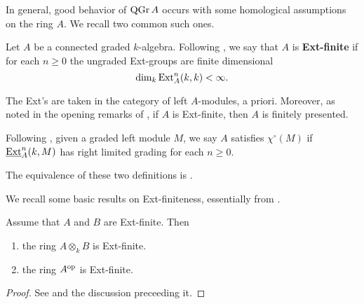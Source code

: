 In general, good behavior of \(\operatorname{QGr}A\) occurs with some homological assumptions on the ring \(A\). We recall two common such ones. 

\begin{definition} \label{definition: Ext-finite}
  Let \(A\) be a connected graded \(k\)-algebra. Following \textcite{VdB}, we say that \(A\) is \textbf{Ext-finite} if for each \(n \geq 0\) the ungraded Ext-groups are finite dimensional 
  \begin{displaymath}
    \operatorname{dim}_k \operatorname{Ext}_A^n (k,k) < \infty.
  \end{displaymath}
\end{definition}

\begin{remark}
  The Ext's are taken in the category of left \(A\)-modules, a priori.
  Moreover, as noted in the opening remarks of \textcite[Section 4.1]{BVdB}, if \(A\) is Ext-finite, then \(A\) is finitely presented.
\end{remark}

\begin{definition} \label{definition: chi}
  Following \textcite{AZ94}, given a graded left module \(M\), we say \(A\) satisfies \(\chi^\circ(M)\) if \(\underline{\operatorname{Ext}}^n_A(k,M)\) has right limited grading for each \(n \geq 0\). 

\end{definition}

\begin{remark}
  The equivalence of these two definitions is \textcite[Proposition 3.8 (1)]{AZ94}.
\end{remark}

We recall some basic results on Ext-finiteness, essentially from \textcite[Section 4]{VdB}.

\begin{proposition} \label{proposition: tensor and op properties of ext-finite}
  Assume that \(A\) and \(B\) are Ext-finite. Then
  \begin{enumerate}
  \item the ring \(A \otimes_k B\) is Ext-finite. 
  \item the ring \(A^{\operatorname{op}}\) is Ext-finite.
  \end{enumerate}
\end{proposition}

\begin{proof}
  See \textcite[Lemma 4.2]{VdB} and the discussion preceeding it. 
\end{proof}

